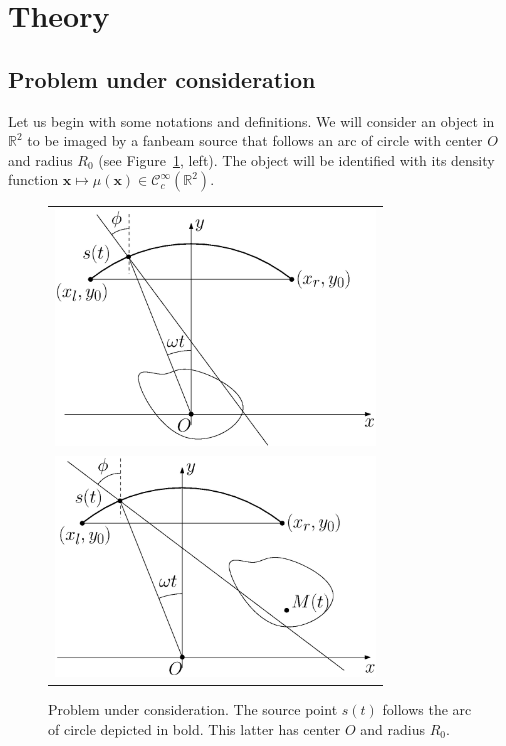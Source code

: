 \documentclass[9pt,technote]{IEEEtran}
\numberwithin{equation}{section}
\newcommand{\R}{\mathbb{R}}
\newcommand{\Ccinf}{\mathcal{C}_c^{\infty}}
\begin{document}
\section{Theory} 
\label{sec:theory}

\subsection{Problem under consideration}
\label{sub:problem_under_consideration}

Let us begin with some notations and definitions. We will consider an object in $\R^2$ to be imaged by a fanbeam source that follows an arc of circle with center $O$ and radius $R_0$ (see Figure~\ref{fig:notations}, left). The object will be identified with its density function $\mathbf{x} \mapsto \mu(\mathbf{x}) \in \Ccinf(\R^2)$.
\begin{figure}[!ht]
	\centering
	\begin{tabular}{c}
	\includegraphics[width=85mm]{figs/frame_scanner_still.eps} \\
	\includegraphics[width=85mm]{figs/frame_scanner.eps}
	\end{tabular}
	\caption{Problem under consideration. The source point $s(t)$ follows the arc of circle depicted in bold. This latter has center $O$ and radius $R_0$.\label{fig:notations}}
\end{figure}
\end{document}
